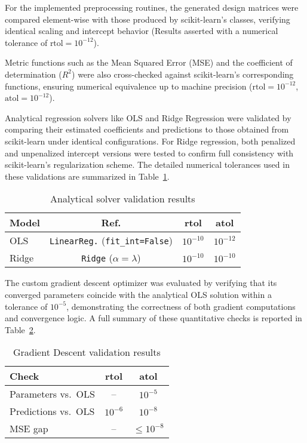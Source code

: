 \documentclass[
 reprint,            %
 amsmath,amssymb,
 aps,
]{revtex4-2}
\begin{document}
For the implemented preprocessing routines, the generated design matrices were compared element-wise with those produced by scikit-learn's classes, verifying identical scaling and intercept behavior (Results asserted with a numerical tolerance of \(\text{rtol}=10^{-12}\)).

Metric functions such as the Mean Squared Error (MSE) and the coefficient of determination ($R^2$) were also cross-checked against scikit-learn's corresponding functions, ensuring numerical equivalence up to machine precision (\(\text{rtol}=10^{-12}\), \(\text{atol}=10^{-12}\)).

Analytical regression solvers like OLS and Ridge Regression were validated by comparing their estimated coefficients and predictions to those obtained from scikit-learn under identical configurations. 
For Ridge regression, both penalized and unpenalized intercept versions were tested to confirm full consistency with scikit-learn's regularization scheme. 
The detailed numerical tolerances used in these validations are summarized in Table~\ref{tab:analytical_solvers}.

\begin{table}[H]
\centering
\small
\setlength{\tabcolsep}{3pt}
\caption{Analytical solver validation results}
\label{tab:analytical_solvers}
\begin{tabular}{lccc}
\toprule
\textbf{Model} & \textbf{Ref.} & \textbf{rtol} & \textbf{atol} \\
\midrule
OLS & \texttt{LinearReg.} (\texttt{fit\_int=False}) & $10^{-10}$ & $10^{-12}$ \\
Ridge & \texttt{Ridge} ($\alpha=\lambda$) & $10^{-10}$ & $10^{-10}$ \\
\bottomrule
\end{tabular}
\end{table}

The custom gradient descent optimizer was evaluated by verifying that its converged parameters coincide with the analytical OLS solution within a tolerance of $10^{-5}$, demonstrating the correctness of both gradient computations and convergence logic. 
A full summary of these quantitative checks is reported in Table~\ref{tab:gd_validation}.

\begin{table}[H]
\centering
\small
\setlength{\tabcolsep}{3pt}
\caption{Gradient Descent validation results}
\label{tab:gd_validation}
\begin{tabular}{lcc}
\toprule
\textbf{Check} & \textbf{rtol} & \textbf{atol} \\
\midrule
Parameters vs.\ OLS & – & $10^{-5}$ \\
Predictions vs.\ OLS & $10^{-6}$ & $10^{-8}$ \\
MSE gap & – & $\le 10^{-8}$ \\
\bottomrule
\end{tabular}
\end{table}
\end{document}
